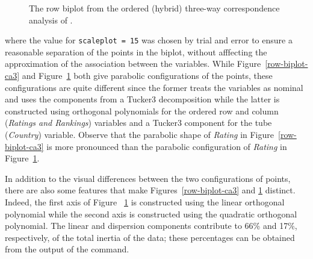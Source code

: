 \begin{figure}[h]
	\begin{center}

		\caption{\label{row-biplot-oca3} The row biplot from the ordered (hybrid) three-way correspondence analysis of .}
	\end{center}
\end{figure}
\noindent where the value for \verb|scaleplot = 15| was chosen by trial and error to ensure a reasonable separation of the points in the biplot, without afffecting the approximation of the association between the variables.
While Figure~\ref{row-biplot-ca3} and Figure~\ref{row-biplot-oca3} both give parabolic configurations of the points, these configurations are quite different since the former treats the variables as  nominal and uses the components from a Tucker3 decomposition while the latter is constructed using orthogonal polynomials for the ordered row and column ({\it Ratings and Rankings}) variables and a Tucker3 component for the tube ({\it Country}) variable. Observe that the parabolic shape of {\it Rating}  in Figure~\ref{row-biplot-ca3}  is more pronounced than  the parabolic configuration of {\it Rating}  in Figure~\ref{row-biplot-oca3}. 

In addition to the visual differences between the two configurations of points, there are also some  features that make Figures~\ref{row-biplot-ca3} and \ref{row-biplot-oca3} distinct. 
Indeed, the first axis of Figure ~\ref{row-biplot-oca3} is constructed using the linear orthogonal polynomial while the second axis is constructed using the quadratic orthogonal polynomial. The linear and dispersion components contribute to 66\% and 17\%, respectively, of the total inertia of the data; these percentages can be obtained  from the output of the  command.
		
